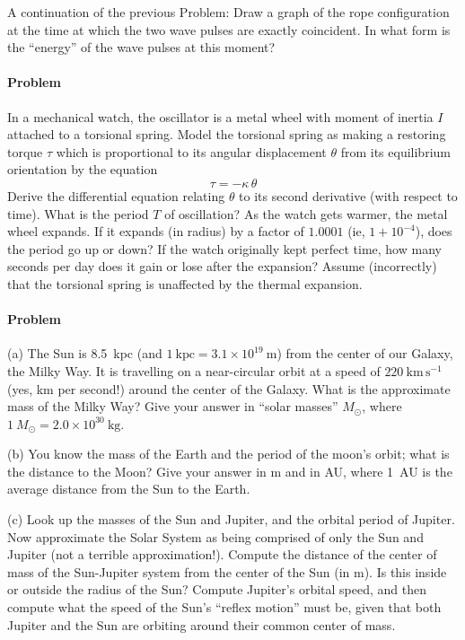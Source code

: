 \documentclass[12pt]{article}
\newcounter{problem}
\begin{document}
A continuation of the previous Problem: Draw a graph of the rope
configuration at the time at which the two wave pulses are exactly
coincident.  In what form is the ``energy'' of the wave pulses at this
moment?

\paragraph{Problem~\theproblem}

In a mechanical watch, the oscillator is a metal wheel with moment of
inertia $I$ attached to a torsional spring.  Model the torsional
spring as making a restoring torque $\tau$ which is proportional to
its angular displacement $\theta$ from its equilibrium orientation by
the equation
\begin{equation}
\tau = -\kappa\,\theta \nonumber
\end{equation}
Derive the differential equation relating $\theta$ to its second
derivative (with respect to time).  What is the period $T$ of
oscillation?  As the watch gets warmer, the metal wheel expands.  If
it expands (in radius) by a factor of $1.0001$ (ie, $1+10^{-4}$), does
the period go up or down?  If the watch originally kept perfect time,
how many seconds per day does it gain or lose after the expansion?
Assume (incorrectly) that the torsional spring is unaffected by the
thermal expansion.

\paragraph{Problem~\theproblem}

(a) The Sun is 8.5~kpc (and $1~\mathrm{kpc}=3.1\times
10^{19}~\mathrm{m}$) from the center of our Galaxy, the Milky Way.  It
is travelling on a near-circular orbit at a speed of
$220~\mathrm{km\,s^{-1}}$ (yes, km per second!) around the center of
the Galaxy.  What is the approximate mass of the Milky Way?  Give your
answer in ``solar masses'' $M_\odot$, where $1~M_\odot= 2.0\times
10^{30}~\mathrm{kg}$.

(b) You know the mass of the Earth and the period of the moon's orbit;
what is the distance to the Moon?  Give your answer in m and in AU,
where 1~AU is the average distance from the Sun to the Earth.

(c) Look up the masses of the Sun and Jupiter, and the orbital period
of Jupiter.  Now approximate the Solar System as being comprised of
only the Sun and Jupiter (not a terrible approximation!).  Compute the
distance of the center of mass of the Sun-Jupiter system from the
center of the Sun (in m).  Is this inside or outside the radius of the
Sun?  Compute Jupiter's orbital speed, and then compute what the speed
of the Sun's ``reflex motion'' must be, given that both Jupiter and
the Sun are orbiting around their common center of mass.
\end{document}
